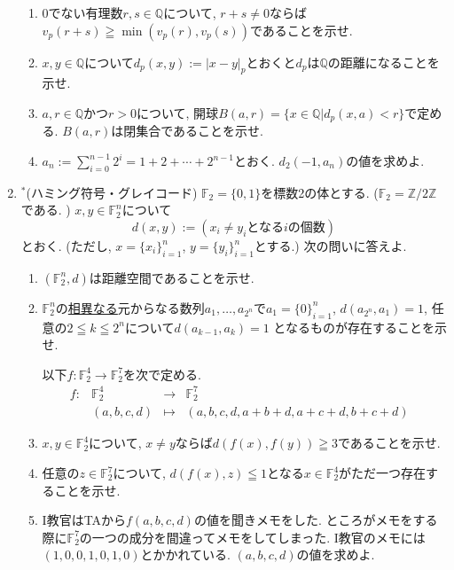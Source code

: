 \documentclass[dvipdfmx,a4paper,11pt]{article}
\newcommand{\Z}{\mathbb{Z}}
\newcommand{\Q}{\mathbb{Q}}
\theoremstyle{definition}
\begin{document}
\begin{enumerate}[label=\textbf{問}\ref*{sec-11}.\arabic*]
  \begin{enumerate}[label=(\arabic*).]
 \setlength{\parskip}{0cm}
  \setlength{\itemsep}{0pt} 
\item 0でない有理数$r,s \in \Q$について, $r+s \neq 0$ならば$v_{p}(r+s) \geqq \min(v_{p}(r), v_{p}(s))$であることを示せ.
\item $x,y \in \Q$について$d_{p}(x,y) :=|x-y|_{p} $とおくと$d_{p}$は$\Q$の距離になることを示せ.
\item $a,r \in \Q$かつ$r>0$について, 開球$B(a,r)=\{x \in \Q | d_{p}(x,a) < r \}$で定める. $B(a,r)$は閉集合であることを示せ.
\item $a_n := \sum_{i=0}^{n-1}2^i =1 + 2 + \cdots + 2^{n-1}$とおく. $d_{2}(-1, a_{n})$の値を求めよ. 
\end{enumerate}

\newpage
\item $^{*}$(ハミング符号・グレイコード)
$\mathbb{F}_{2}=\{0,1\}$を標数2の体とする. ($\mathbb{F}_2=\Z/2\Z$である. )
$x,y \in \mathbb{F}_{2}^{n}$について
$$
d(x,y):= (\text{$x_i \neq y_i$となる$i$の個数})
$$
とおく. (ただし, $x=\{ x_i\}_{i=1}^{n}$, $y=\{ y_i\}_{i=1}^{n}$とする.) 次の問いに答えよ.
  \begin{enumerate}[label=(\arabic*).]
 \setlength{\parskip}{0cm}
  \setlength{\itemsep}{0pt}
\item $(\mathbb{F}_{2}^{n}, d)$は距離空間であることを示せ.
\item $\mathbb{F}_{2}^{n}$の\underline{相異なる}元からなる数列$a_{1}, \ldots, a_{2^n }$で$a_1=\{ 0\}_{i=1}^{n}$, $d(a_{2^n }, a_{1})=1$, 任意の$2 \leqq k \leqq 2^{n}$について$d(a_{k-1},a_{k})=1$
 となるものが存在することを示せ.
 
 \hspace{-22pt}以下$f : \mathbb{F}_{2}^{4} \to \mathbb{F}_{2}^{7}$を次で定める.
$$
\begin{array}{ccccc}
f: &\mathbb{F}_{2}^{4}& \rightarrow & \mathbb{F}_{2}^{7}& \\
&(a,b,c,d) & \longmapsto & 
(a,b,c,d,a+b+d, a+c+d, b+c+d)&
\end{array}
$$


\item $x, y \in \mathbb{F}_{2}^{4}$について, $x\neq y$ならば$d(f(x), f(y)) \geqq 3$であることを示せ.
\item 任意の$z \in \mathbb{F}_{2}^{7}$について, $d(f(x), z) \leqq 1$となる$x \in \mathbb{F}_{2}^{4} $がただ一つ存在することを示せ.
\item I教官はTAから$f(a,b,c,d)$の値を聞きメモをした. ところがメモをする際に$\mathbb{F}_{2}^{7}$の一つの成分を間違ってメモをしてしまった.  I教官のメモには$(1,0,0,1,0,1,0)$とかかれている. $(a,b,c,d)$の値を求めよ. 
  \end{enumerate}
  
 \end{enumerate}
\end{document}
